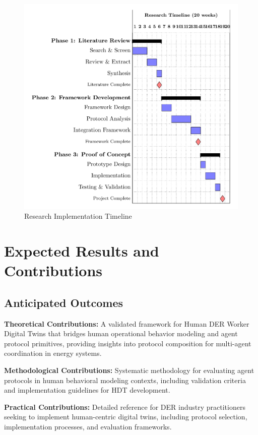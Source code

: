 \documentclass[12pt,a4paper]{article}
\begin{document}
\begin{figure}[h!]
    \centering
    \includegraphics[width=.8\linewidth]{timeline-gantt-simple-1.png}
    \caption{Research Implementation Timeline}
    \label{fig:timeline}
\end{figure}

\section{Expected Results and Contributions}
\label{sec:results}

\subsection{Anticipated Outcomes}

\noindent \textbf{Theoretical Contributions:} A validated framework for Human DER Worker Digital Twins that bridges human operational behavior modeling and agent protocol primitives, providing insights into protocol composition for multi-agent coordination in energy systems.

\noindent \textbf{Methodological Contributions:} Systematic methodology for evaluating agent protocols in human behavioral modeling contexts, including validation criteria and implementation guidelines for HDT development.

\noindent \textbf{Practical Contributions:} Detailed reference for DER industry practitioners seeking to implement human-centric digital twins, including protocol selection, implementation processes, and evaluation frameworks.
\end{document}
